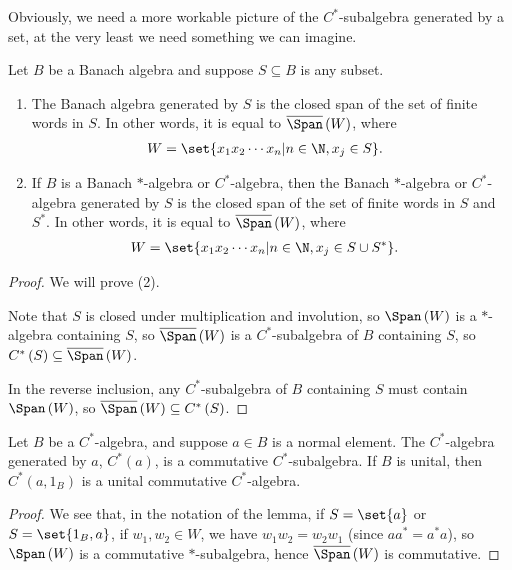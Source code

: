 \documentclass[10pt]{mypackage}
\begin{document}
Obviously, we need a more workable picture of the $C^{\ast}$-subalgebra generated by a set, at the very least we need something we can imagine.
\begin{lemma}
  Let $B$ be a Banach algebra and suppose $S\subseteq B$ is any subset.
  \begin{enumerate}[(1)]
    \item The Banach algebra generated by $S$ is the closed span of the set of finite words in $S$. In other words, it is equal to $\overline{\Span}\left(W\right)$, where
      \begin{align*}
        W &= \set{x_1x_2\cdots x_n | n\in \N,x_j\in S}.
      \end{align*}
    \item If $B$ is a Banach $\ast$-algebra or $C^{\ast}$-algebra, then the Banach $\ast$-algebra or $C^{\ast}$-algebra generated by $S$ is the closed span of the set of finite words in $S$ and $S^{\ast}$. In other words, it is equal to $\overline{\Span}\left(W\right)$, where
      \begin{align*}
        W &= \set{x_1x_2\cdots x_n | n\in \N, x_j\in S\cup S^{\ast}}.
      \end{align*}
  \end{enumerate}
\end{lemma}
\begin{proof}
  We will prove (2).\newline

  Note that $S$ is closed under multiplication and involution, so $\Span\left(W\right)$ is a $\ast$-algebra containing $S$, so $\overline{\Span}\left(W\right)$ is a $C^{\ast}$-subalgebra of $B$ containing $S$, so $C^{\ast}\left(S\right)\subseteq \overline{\Span}\left(W\right)$.\newline

  In the reverse inclusion, any $C^{\ast}$-subalgebra of $B$ containing $S$ must contain $\Span\left(W\right)$, so $\overline{\Span}\left(W\right)\subseteq C^{\ast}\left(S\right)$.
\end{proof}
\begin{proposition}
  Let $B$ be a $C^{\ast}$-algebra, and suppose $a\in B$ is a normal element. The $C^{\ast}$-algebra generated by $a$, $C^{\ast}\left(a\right)$, is a commutative $C^{\ast}$-subalgebra. If $B$ is unital, then $C^{\ast}\left(a,1_B\right)$ is a unital commutative $C^{\ast}$-algebra.
\end{proposition}
\begin{proof}
  We see that, in the notation of the lemma, if $S = \set{a}$ or $S = \set{1_B,a}$, if $w_1,w_2\in W$, we have $w_1w_2 = w_2w_1$ (since $aa^{\ast} = a^{\ast}a$), so $\Span\left(W\right)$ is a commutative $\ast$-subalgebra, hence $\overline{\Span}\left(W\right)$ is commutative.
\end{proof}
\end{document}
